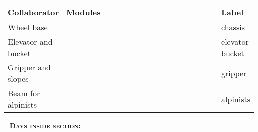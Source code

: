 	\begin{table}[H]
		\vspace{-2mm}
		\begin{center}
			\begin{tabular}{|p{0.2\linewidth}|p{0.7\linewidth}|p{0.1\linewidth}|}
				\hline
				Collaborator & Modules & Label \\
				\hline
				Wheel base &  & chassis \\
				\hline
				Elevator and bucket &  & elevator bucket \\
				\hline
				Gripper and slopes &  & gripper \\
				\hline
				Beam for alpinists &  & alpinists \\
				\hline
			\end{tabular}
		\end{center}
	\end{table}
  
   \newline
  \textsc{\textbf{Days inside section:}}
  
  
  
  
  
